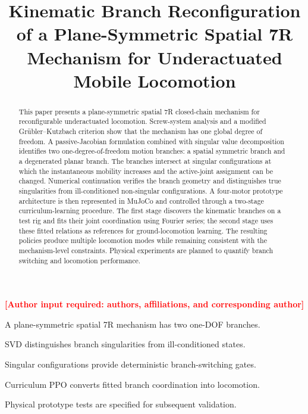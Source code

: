 ﻿\documentclass[a4paper,fleqn]{cas-sc}
\newcommand{\missing}[1]{\textcolor{red}{\textbf{[#1]}}}
\begin{document}

\title[mode=title]{Kinematic Branch Reconfiguration of a Plane-Symmetric Spatial 7R Mechanism for Underactuated Mobile Locomotion}

\missing{Author input required: authors, affiliations, and corresponding author}

\begin{abstract}
This paper presents a plane-symmetric spatial 7R closed-chain mechanism for
reconfigurable underactuated locomotion. Screw-system analysis and a modified
Gr\"ubler--Kutzbach criterion show that the mechanism has one global degree of
freedom. A passive-Jacobian formulation combined with singular value
decomposition identifies two one-degree-of-freedom motion branches: a spatial
symmetric branch and a degenerated planar branch. The branches intersect at
singular configurations at which the instantaneous mobility increases and the
active-joint assignment can be changed. Numerical continuation verifies the
branch geometry and distinguishes true singularities from ill-conditioned
non-singular configurations. A four-motor prototype architecture is then
represented in MuJoCo and controlled through a two-stage curriculum-learning
procedure. The first stage discovers the kinematic branches on a test rig and
fits their joint coordination using Fourier series; the second stage uses
these fitted relations as references for ground-locomotion learning. The
resulting policies produce multiple locomotion modes while remaining
consistent with the mechanism-level constraints. Physical experiments are
planned to quantify branch switching and locomotion performance.
\end{abstract}

\begin{highlights}
\item A plane-symmetric spatial 7R mechanism has two one-DOF branches.
\item SVD distinguishes branch singularities from ill-conditioned states.
\item Singular configurations provide deterministic branch-switching gates.
\item Curriculum PPO converts fitted branch coordination into locomotion.
\item Physical prototype tests are specified for subsequent validation.
\end{highlights}
\end{document}
